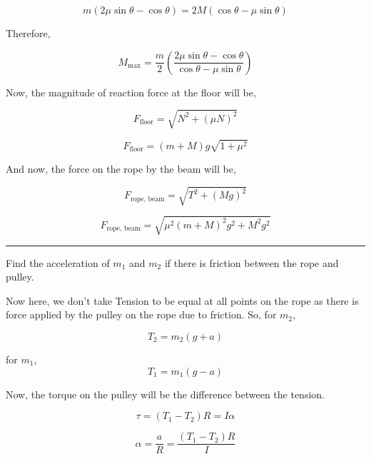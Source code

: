\documentclass[twocolumn]{article}
\begin{document}
\[
    m(2\mu \sin \theta - \cos \theta) = 2M (\cos \theta - \mu \sin \theta )
\]

Therefore, 

\[
    \boxed{M_{\text{max} } = \frac{m}{2} (\frac{2\mu \sin \theta - \cos \theta }{\cos \theta - \mu \sin \theta})}
\]

Now, the magnitude of reaction force at the floor will be,

\[
    F_{\text{floor} }  = \sqrt{N^{2} + (\mu N)^{2} }
\]

\[
    \boxed{F_{\text{floor} } = (m + M)g \sqrt{1 + \mu ^{2} }}
\]

And now, the force on the rope by the beam will be,

\[
    F_{\text{rope, beam} } = \sqrt{T^{2} + (Mg)^{2} }  
\]

\[
    \boxed{F_{\text{rope, beam} } = \sqrt{\mu ^{2} (m + M)^{2} g^{2} + M^{2} g^{2} }  }
\]

\vspace{0.1in}
\hrule 

\begin{question}
    Find the acceleration of \(m_1\) and \(m_2\) if there is friction between the rope and pulley. 
    \begin{center}
    \end{center}
\end{question}

Now here, we don't take Tension to be equal at all points on the rope as there is force applied by the pulley on the rope due to friction. So, for \(m_2\),

\[
    T_2 = m_2 (g + a)
\]

for \(m_1\),
\[
    T_1 = m_1 (g - a)
\]

Now, the torque on the pulley will be the difference between the tension. 

\[
    \tau = (T_1 - T_2)R = I \alpha 
\]

\[
    \alpha = \frac{a}{R} = \frac{(T_1 - T_2)R}{I}
\]
\end{document}

